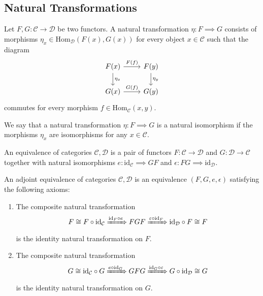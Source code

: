 \subsection{Natural Transformations} %
\label{sub:natural_transformations}

\begin{definition}
  Let $ F,G:\mathcal{C} \to \mathcal{D} $ be two functors. A natural transformation $ \eta: F \implies G $ consists
  of morphisms $ \eta_x \in \text{Hom}_\mathcal{D}(F(x), G(x)) $ for every object $ x \in \mathcal{C} $ such that the diagram
  \[\begin{tikzcd}
	{F(x)} & {F(y)} \\
	{G(x)} & {G(y)}
	\arrow["{F(f)}", from=1-1, to=1-2]
	\arrow["{G(f)}", from=2-1, to=2-2]
	\arrow["{\eta_x}", from=1-1, to=2-1]
	\arrow["{\eta_y}", from=1-2, to=2-2]
\end{tikzcd}\]
commutes for every morphism $ f \in \text{Hom}_\mathcal{C}(x,y) $.

We say that a natural transformation $ \eta:F \implies G $ is a natural isomorphism if the morphisms $ \eta_x $ are isomorphisms for any $ x \in \mathcal{C} $.
\end{definition}

\begin{definition}
  An equivalence of categories $ \mathcal{C}, \mathcal{D} $ is a pair of functors $ F: \mathcal{C}\to \mathcal{D} $ and $ G:\mathcal{D} \to \mathcal{C} $ together with natural isomorphisms $ e: \text{id}_\mathcal{C} \implies GF $ and $ \epsilon: FG \implies \text{id}_\mathcal{D} $.
\end{definition}

\begin{definition}
  An adjoint equivalence of categories $ \mathcal{C}, \mathcal{D} $ is an equivalence $ (F,G,e,\epsilon) $ satisfying the following axioms:
  \begin{enumerate}
    \item The composite natural transformation
      \begin{equation*}
        F \cong F \circ \text{id}_\mathcal{C} \xRightarrow{\text{id}_F \circ e} FGF \xRightarrow{\epsilon\circ \text{id}_F} \text{id}_\mathcal{D} \circ F \cong F
      \end{equation*}
      is the identity natural transformation on $ F $.

    \item The composite natural transformation
      \begin{equation*}
        G \cong \text{id}_\mathcal{C}\circ G   \xRightarrow{e \circ \text{id}_G} GFG \xRightarrow{\text{id}_G \circ \epsilon} G \circ \text{id}_\mathcal{D} \cong G
      \end{equation*}
      is the identity natural transformation on $ G $.
  \end{enumerate}
\end{definition}


